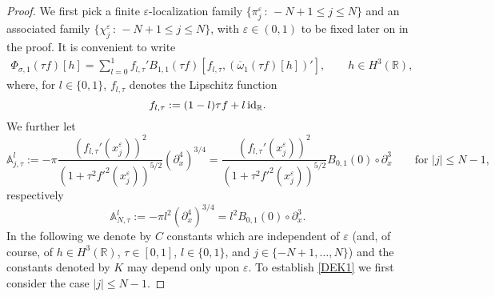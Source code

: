 \documentclass[11pt,reqno]{amsart}
\numberwithin{equation}{section}
\newcommand{\0}{\Omega}
\newcommand{\e}{\varepsilon}
\newcommand{\p}{\partial}
\newcommand{\ov}{\overline}
\newcommand{\oo}{\ov\omega}
\newcommand{\bA}{\mathbb{A}}
\newcommand{\R}{\mathbb{R}}
\numberwithin{equation}{section}
\begin{document}
\begin{proof} 
We first pick   a finite $\e$-localization family  $\{\pi_j^\e\,:\, -N+1\leq j\leq N\} $  and an associated family  $\{\chi_j^\e\,:\, -N+1\leq j\leq N\} $, 
with $\e\in(0,1)$ to be  fixed later on in the proof.
It is convenient to write
\begin{align}\label{LL2}
 \Phi_{\sigma,1}(\tau f)[h] =\sum_{l=0}^1 f_{l,\tau}'B_{1,1}(\tau f)[f_{l,\tau},(\oo_1(\tau f)[h])'],\qquad h\in H^3(\R),
\end{align}
where, for $l\in\{0,1\}$, $f_{l,\tau}$ denotes the Lipschitz function
\[
f_{l,\tau}:=(1-l)\tau f+l{\, \rm id}_\R.
\] 
We further let 
\[
\bA^l_{j,\tau} :=- \pi \frac{ (f_{l,\tau}'(x_j^\e) )^2}{(1+\tau^2 f'^2(x_j^\e)  )^{5/2}}  (\p_x^4 )^{3/4}= \frac{ (f_{l,\tau}'(x_j^\e) )^2}{(1+\tau^2 f'^2(x_j^\e)  )^{5/2}}B_{0,1}(0)\circ\p_x^3\qquad\text{for $|j|\leq N-1$},
\]
respectively
\[
\bA^l_{N,\tau} :=- \pi  l^2   (\p_x^4 )^{3/4}=l^2B_{0,1}(0)\circ\p_x^3.
\]
In the following we denote by $C$ constants which are
independent of $\e$ (and, of course, of $h\in H^3(\R)$, $\tau\in [0,1]$, $l\in\{0,1\}$, and $j \in \{-N+1, \ldots, N\}$) and the constants  denoted by $K$ may depend only upon $\e.$
To establish \eqref{DEK1} we first consider  the case $|j|\leq N-1$.\medskip


\end{proof}
\end{document}

